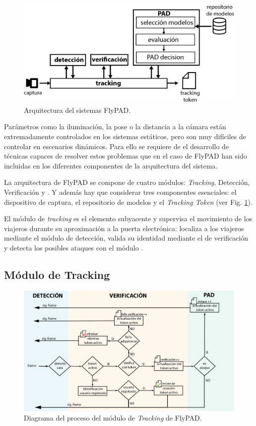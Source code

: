 \begin{figure}[t!]
    \centering
    \includegraphics[width=.8\textwidth]{ch-sistemasABC/images/ch-onthefly/GRAFICA-PROCESO.png}
    \caption{Arquitectura del sistemas \gls{FlyPAD}.}
    \label{fig:architecture}
\end{figure}

Parámetros como la iluminación, la pose o la distancia a la cámara están extremadamente controlados en los sistemas  estáticos, pero son muy difíciles de controlar en escenarios dinámicos. Para ello se requiere de el desarrollo de técnicas capaces de resolver estos problemas que en el caso de \gls{FlyPAD} han sido incluidas en los diferentes componentes de la arquitectura del sistema.

La arquitectura de \gls{FlyPAD} se compone de cuatro módulos: \textit{Tracking}, Detección, Verificación y . Y además hay que considerar tres componentes esenciales: el dispositivo de captura, el repositorio de modelos y el \textit{Tracking Token} (ver Fig. \ref{fig:architecture}).

El módulo de \textit{tracking} es el elemento subyacente y supervisa el movimiento de los viajeros durante su aproximación a la puerta electrónica: localiza a los viajeros mediante el módulo de detección, valida su identidad mediante el de verificación y detecta los posibles ataques con el módulo .

\subsection{Módulo de Tracking}

\begin{figure}[t!]
    \centering
    \includegraphics[width=1\textwidth]{ch-sistemasABC/images/ch-onthefly/DIAGRAMA_FLUJO_FLYPAD.png}
    \caption{Diagrama del proceso del módulo de \textit{Tracking} de \gls{FlyPAD}.}
    \label{fig:diagramaTracking}
\end{figure}

